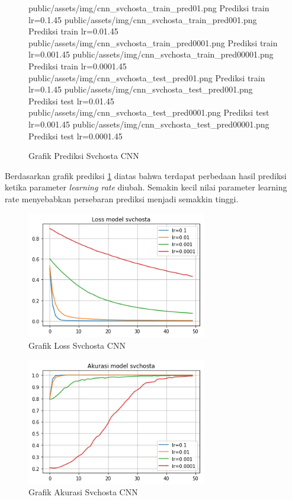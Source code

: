\documentclass[./skripsi.tex]{subfiles}
\begin{document}
\begin{figure}%
\centering
\buatsubgrafik 
{public/assets/img/cnn_svchosta_train_pred01.png}
{Prediksi train lr=0.1}{.45}{}
\buatsubgrafik 
{public/assets/img/cnn_svchosta_train_pred001.png}
{Prediksi train lr=0.01}{.45}{}
\buatsubgrafik 
{public/assets/img/cnn_svchosta_train_pred0001.png}
{Prediksi train lr=0.001}{.45}{}
\buatsubgrafik 
{public/assets/img/cnn_svchosta_train_pred00001.png}
{Prediksi train lr=0.0001}{.45}{}
\buatsubgrafik 
{public/assets/img/cnn_svchosta_test_pred01.png}
{Prediksi train lr=0.1}{.45}{}
\buatsubgrafik 
{public/assets/img/cnn_svchosta_test_pred001.png}
{Prediksi test lr=0.01}{.45}{}
\buatsubgrafik 
{public/assets/img/cnn_svchosta_test_pred0001.png}
{Prediksi test lr=0.001}{.45}{}
\buatsubgrafik 
{public/assets/img/cnn_svchosta_test_pred00001.png}
{Prediksi test lr=0.0001}{.45}{}
\caption{Grafik Prediksi Svchosta CNN}
\label{fig:cnn_svchosta_pred}
\end{figure}
\par Berdasarkan grafik prediksi \ref{fig:cnn_svchosta_pred} diatas bahwa terdapat perbedaan hasil prediksi ketika parameter \textit{learning rate} diubah. Semakin kecil nilai parameter learning rate menyebabkan persebaran prediksi menjadi semakkin tinggi.
\begin{figure}%
	\centering
	\includegraphics[width=0.7\textwidth]{public/assets/img/cnn_svchosta_loss.png}
	\caption{Grafik Loss Svchosta CNN}
	\label{fig:cnn_svchosta_loss}
\end{figure}
\begin{figure}%
	\centering
	\includegraphics[width=0.7\textwidth]{public/assets/img/cnn_svchosta_acc.png}
	\caption{Grafik Akurasi Svchosta CNN}
	\label{fig:cnn_svchosta_acc}
\end{figure}
\end{document}
